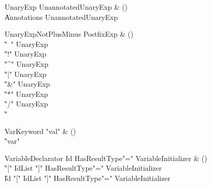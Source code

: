 \begin{bbgrammar}

UnaryExp \label{prod:UnaryExp}  \: UnannotatedUnaryExp & () \\

    \| Annotations UnannotatedUnaryExp \\

\end{bbgrammar}

\begin{bbgrammar}

UnaryExpNotPlusMinus \label{prod:UnaryExpNotPlusMinus}  \: PostfixExp & () \\

    \| \xcd"~" UnaryExp \\
    \| \xcd"!" UnaryExp \\
    \| \xcd"^" UnaryExp \\
    \| \xcd"|" UnaryExp \\
    \| \xcd"&" UnaryExp \\
    \| \xcd"*" UnaryExp \\
    \| \xcd"/" UnaryExp \\
    \| \xcd"%

\end{bbgrammar}

\begin{bbgrammar}

VarKeyword \label{prod:VarKeyword}  \: \xcd"val" & () \\

    \| \xcd"var" \\

\end{bbgrammar}

\begin{bbgrammar}

VariableDeclarator \label{prod:VariableDeclarator}  \: Id HasResultType\opt \xcd"=" VariableInitializer & () \\

    \| \xcd"[" IdList \xcd"]" HasResultType\opt \xcd"=" VariableInitializer \\
    \| Id \xcd"[" IdList \xcd"]" HasResultType\opt \xcd"=" VariableInitializer \\

\end{bbgrammar}

